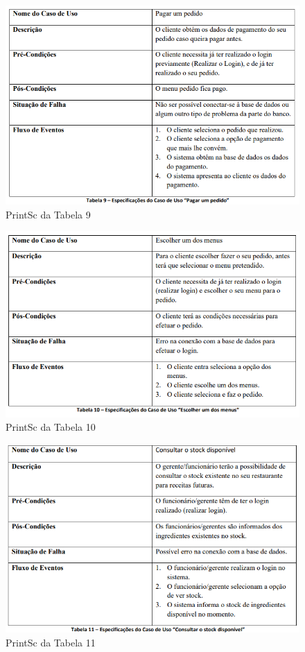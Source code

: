 \FloatBarrier
\begin{figure}[!hbt]
    \centering
    \includegraphics[width=14cm]{Resources/TablesPrintSc/9.png}
    \caption{PrintSc da Tabela 9}
    
\end{figure}
\FloatBarrier
\begin{figure}[!hbt]
    \centering
    \includegraphics[width=14cm]{Resources/TablesPrintSc/10.png}
    \caption{PrintSc da Tabela 10}
    
\end{figure}
\FloatBarrier
\begin{figure}[!hbt]
    \centering
    \includegraphics[width=14cm]{Resources/TablesPrintSc/11.png}
    \caption{PrintSc da Tabela 11}
    
\end{figure}
